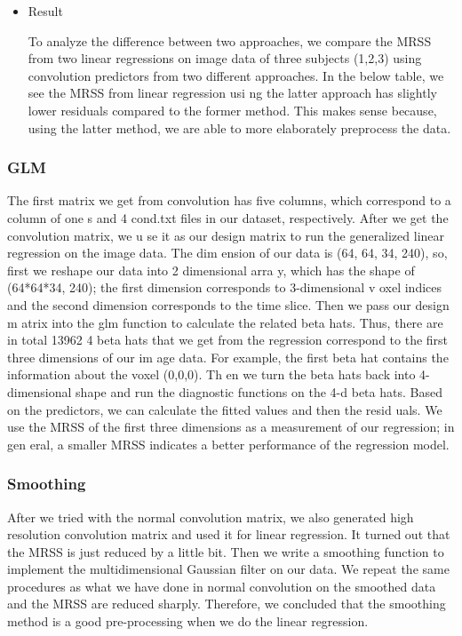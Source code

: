 \begin{itemize}
\begin{itemize} 
\item Result \\
\begin{adjustwidth}{2cm}{}
To analyze the difference between two approaches, we compare the MRSS from two linear 
regressions on image data of three subjects (1,2,3) using convolution predictors from 
two different approaches. In the below table, we see the MRSS from linear regression usi
ng the latter approach has slightly lower residuals compared to the former method. This 
makes sense because, using the latter method, we are able to more elaborately preprocess 
the data.
\end{adjustwidth}
\end{itemize}
\end{itemize}


\subsubsection {GLM}
The first matrix we get from convolution has five columns, which correspond to a column of one
s and 4 cond.txt files in our dataset, respectively. After we get the convolution matrix, we u
se it as our design matrix to run the generalized linear regression on the image data. The dim
ension of our data is (64, 64, 34, 240), so, first we reshape our data into 2 dimensional arra
y, which has the shape of (64*64*34, 240); the first dimension corresponds to 3-dimensional v
oxel indices and the second dimension corresponds to the time slice. Then we pass our design m
atrix into the glm function to calculate the related beta hats. Thus, there are in total 13962
4 beta hats that we get from the regression correspond to the first three dimensions of our im
age data. For example, the first beta hat contains the information about the voxel (0,0,0). Th
en we turn the beta hats back into 4-dimensional shape and run the diagnostic functions on the
 4-d beta hats. Based on the predictors, we can calculate the fitted values and then the resid
 uals. We use the MRSS of the first three dimensions as a measurement of our regression; in gen
 eral, a smaller MRSS indicates a better performance of the regression model. 

\subsubsection {Smoothing}
After we tried with the normal convolution matrix, we also generated high resolution convolution 
matrix and used it for linear regression. It turned out that the MRSS is just reduced by a little
 bit. Then we write a smoothing function to implement the multidimensional Gaussian filter on our
  data. We repeat the same procedures as what we have done in normal convolution on the smoothed 
  data and the MRSS are reduced sharply. Therefore, we concluded that the smoothing method is a 
  good pre-processing when we do the linear regression. 

